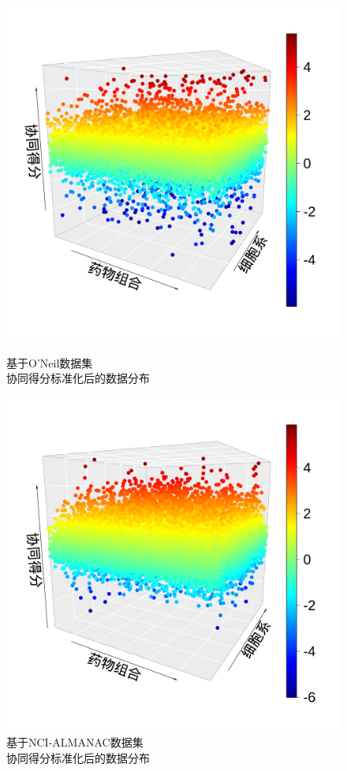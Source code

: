 \begin{figure}
\centering
  \begin{minipage}{0.45\linewidth}
    \centering
    \includegraphics[width=\linewidth]{figures/old_n.pdf}
    \caption{基于O'Neil数据集\\协同得分标准化后的数据分布}
    \label{fig:sub2}
  \end{minipage}%
  \begin{minipage}{0.45\linewidth}
    \centering
    \includegraphics[width=\linewidth]{figures/new_n.pdf}
    \caption{基于NCI-ALMANAC数据集\\协同得分标准化后的数据分布}
    \label{fig:sub4}
  \end{minipage}
\end{figure}

